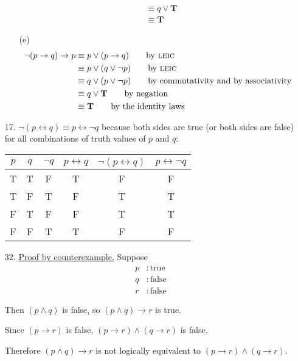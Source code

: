 \documentclass{article}
\begin{document}
\begin{enumerate}
\begin{itemize}
\begin{align*}
        &\equiv q \lor \mathbf{T} \tag*{by negation}\\
        &\equiv \mathbf{T} \tag*{by the identity laws}
        \end{align*}
        \item[(e)]
        \begin{align*}
        \neg(p \rightarrow q) \rightarrow p &\equiv p \lor (p \rightarrow q) \tag*{by \textsc{leic}}\\
        &\equiv p \lor (q \lor \neg p) \tag*{by \textsc{leic}}\\
        &\equiv q \lor (p \lor \neg p) \tag*{by commutativity and by associativity}\\
        &\equiv q \lor \mathbf{T} \tag*{by negation}\\
        &\equiv \mathbf{T} \tag*{by the identity laws}
        \end{align*}
    \end{itemize}
    \item[17.] $\neg (p \leftrightarrow q) \equiv p \leftrightarrow \neg q$ because both sides are true (or both sides are false) for all combinations of truth values of $p$ and $q$:
    \newline
    \begin{tabular}{|c|c|c|c|c|c|}\hline
    $p$ & $q$ & $\neg q$ & $p \leftrightarrow q$ & $\neg (p \leftrightarrow q)$ & $p \leftrightarrow \neg q$\\\hline
    T & T & F & T & F & F \\
    T & F & T & F & T & T \\
    F & T & F & F & T & T \\
    F & F & T & T & F & F \\\hline
    \end{tabular}
    \item[32.] \underline{Proof by counterexample.} Suppose
    \begin{align*}
    p &: \mathrm{true} \\
    q &: \mathrm{false} \\
    r &: \mathrm{false}
    \end{align*}

    Then $(p \land q)$ is false, so $(p \land q) \rightarrow r$ is true.

    Since $(p \rightarrow r)$ is false, $(p \rightarrow r) \land (q \rightarrow r)$ is false.

    Therefore $(p \land q) \rightarrow r$ is not logically equivalent to $(p \rightarrow r) \land (q \rightarrow r)$.
\end{enumerate}
\end{document}
